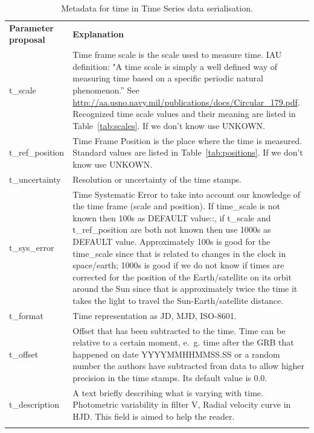 \documentclass[11pt,a4paper]{ivoa}
\begin{document}
\begin{table}[!htb] 
  \begin{center}
    \caption{Metadata for time in Time Series data serialisation.}
    \label{tab:metadata}
      \begin{tabular}{p{}p{}}
      \sptablerule
      \textbf{Parameter proposal} & \textbf{Explanation} \\\sptablerule
      t\_scale & Time frame scale is the scale used to measure time. IAU definition: "A time scale is simply a well defined way of measuring time based on a specific periodic natural phenomenon.''  See \url{http://aa.usno.navy.mil/publications/docs/Circular_179.pdf}. 
      Recognized time scale values and their meaning are listed in Table~\ref{tab:scales}. If we don't know use UNKOWN. \\
      t\_ref\_position &  Time Frame Position is the place where the time is measured. Standard values are listed in Table~\ref{tab:positions}. If we don't know use UNKOWN. \\
      t\_uncertainty & Resolution or uncertainty of the time stamps. \\
      t\_sys\_error  & Time Systematic Error to take into account our knowledge of the time frame (scale and position). If time\_scale is not known then 100s as DEFAULT value::, if t\_scale and t\_ref\_position are both not known then use  1000s as DEFAULT value. Approximately 100s is good for the time\_scale since that is related to changes in the clock in space/earth; 1000s is good if we do not know if times are corrected for the position of the Earth/satellite on its orbit around the Sun since that is approximately twice the time it takes the light to travel the Sun-Earth/satellite distance. \\
      t\_format  & Time representation as JD, MJD, ISO-8601. \\
      t\_offset &  Offset that has been subtracted to the time. Time can be relative to a certain moment, e.~g. time after the GRB that happened on date YYYYMMHHMMSS.SS or a random number the authors have subtracted from data to allow higher precision in the time stamps. Its default value is 0.0. \\
     t\_description & A text briefly describing what is varying with time. Photometric variability in filter V, Radial velocity curve in HJD. This field is aimed to help the reader. \\
    \sptablerule
    \end{tabular}
  \end{center}
\end{table}
\end{document}
